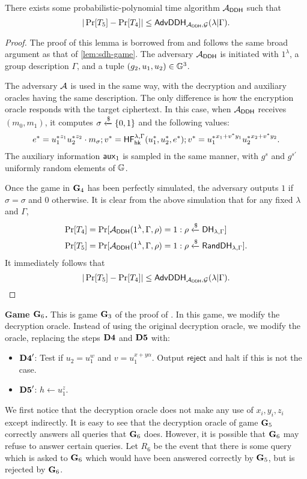 \begin{lemma}
	There exists some probabilistic-polynomial time algorithm $\mathcal{A}_\mathsf{DDH}$ such that $$|\Pr[T_5]-\Pr[T_4]|\leq\mathsf{AdvDDH}_{\mathcal{A}_\mathsf{DDH},\mathcal{G}}(\lambda | \Gamma).$$
\end{lemma}
\begin{proof}
	The proof of this lemma is borrowed from \cite{cs01} and follows the same broad argument as that of \cref{lem:sdh-game}. The adversary $\mathcal{A}_\mathsf{DDH}$ is initiated with $1^\lambda$, a group description $\Gamma$, and a tuple $(g_2, u_1, u_2)\in\mathbb{G}^3$.
	
	The adversary $\mathcal{A}$ is used in the same way, with the decryption and auxiliary oracles having the same description. The only difference is how the encryption oracle responds with the target ciphertext. In this case, when $\mathcal{A}_\mathsf{DDH}$ receives $(m_0,m_1)$, it computes $\sigma\xleftarrow{\$}\{0,1\}$ and the following values:
	$$e^{*} = {u_1^{*}}^{z_1}{u_2^{*}}^{z_2}\cdot m_\sigma; v^{*} =\mathsf{HF}_{\mathsf{hk}}^{\lambda,\Gamma}(u_1^{*},u_2^{*},e^{*}); v^{*} = {u_1^{*}}^{x_1+v^{*}y_1}{u_2^{*}}^{x_2+v^{*}y_2}.$$
	The auxiliary information $\mathsf{aux}_1$ is sampled in the same manner, with $g^s$ and $g^{s'}$ uniformly random elements of $\mathbb{G}$.
	
	Once the game in $\mathbf{G}_4$ has been perfectly simulated, the adversary outputs $1$ if $\hat{\sigma} = \sigma$ and $0$ otherwise. It is clear from the above simulation that for any fixed $\lambda$ and $\Gamma$, 
	\begin{align*}
		\Pr[T_4] &= \Pr[\mathcal{A}_\mathsf{DDH}(1^\lambda,\Gamma,\rho) = 1 : \rho\xleftarrow{\$}\mathsf{DH}_{\lambda,\Gamma}]\\
		\Pr[T_5] &= \Pr[\mathcal{A}_\mathsf{DDH}(1^\lambda,\Gamma,\rho) = 1 : \rho\xleftarrow{\$}\mathsf{RandDH}_{\lambda,\Gamma}].
	\end{align*}
	It immediately follows that 
	$$|\Pr[T_5]-\Pr[T_4]|\leq\mathsf{AdvDDH}_{\mathcal{A}_\mathsf{DDH}, \mathcal{G}}(\lambda|\Gamma).$$
\end{proof}

\textbf{Game $\mathbf{G}_6$.} This is game $\mathbf{G}_3$ of the proof of \cite{cs01}. In this game, we modify the decryption oracle. Instead of using the original decryption oracle, we modify the oracle, replacing the steps $\mathbf{D4}$ and $\mathbf{D5}$ with:
\begin{itemize}
	\item[]$\mathbf{D4}'$: Test if $u_2 = u_1^w$ and $v = u_1^{x+y\alpha}$. Output $\mathsf{reject}$ and halt if this is not the case.
	\item[]$\mathbf{D5}'$: $h\gets u_1^z$.
\end{itemize}
We first notice that the decryption oracle does not make any use of $x_i, y_i, z_i$ except indirectly. It is easy to see that the decryption oracle of game $\mathbf{G}_5$ correctly answers all queries that $\mathbf{G}_6$ does. However, it is possible that $\mathbf{G}_6$ may refuse to answer certain queries. Let $R_6$ be the event that there is some query which is asked to $\mathbf{G}_6$ which would have been answered correctly by $\mathbf{G}_5$, but is rejected by $\mathbf{G}_6$.


